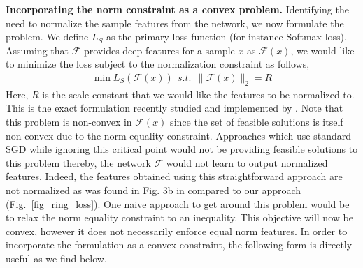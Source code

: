 \documentclass[10pt,twocolumn,letterpaper]{article}
\begin{document}

\textbf{ Incorporating the norm constraint as a convex problem.} Identifying the need to normalize the sample features from the network, we now formulate the problem. We define $L_S$ as the primary loss function (for instance Softmax loss). Assuming that $\mathcal{F}$ provides deep features for a sample $x$ as $\mathcal{F}(x)$, we would like to minimize the loss subject to the normalization constraint as follows,
\begin{align}
\min L_S(\mathcal{F}(x)) ~~s.t. ~~ \|\mathcal{F}(x)\|_2=R \label{eq_1}
\end{align}
Here, $R$ is the scale constant that we would like the features to be normalized to. This is the exact formulation recently studied and implemented by \cite{ranjan2017l2, Wang2017NormFace}. Note that this problem is non-convex in $\mathcal{F}(x)$ since the set of feasible solutions is itself non-convex due to the norm equality constraint. Approaches which use standard SGD while ignoring this critical point would not be providing feasible solutions to this problem thereby, the network $\mathcal{F}$ would not learn to output normalized features. Indeed, the features obtained using this straightforward approach are not normalized as was found in Fig. 3b in \cite{ranjan2017l2} compared to our approach (Fig.~\ref{fig_ring_loss}). One naive approach to get around this problem would be to relax the norm equality constraint to an inequality. This objective will now be convex, however it does not necessarily enforce equal norm features. In order to incorporate the formulation as a convex constraint, the following form is directly useful as we find below.









\end{document}
